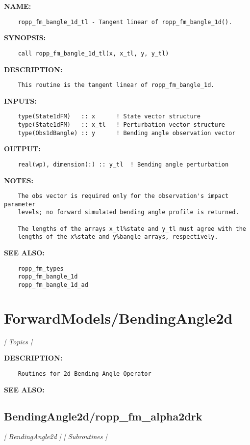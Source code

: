 \label{ch:robo6}
\label{ch:BendingAngle_ropp_fm_bangle_1d_tl}
\textbf{NAME:}\hspace{0.08in}\begin{Verbatim}
    ropp_fm_bangle_1d_tl - Tangent linear of ropp_fm_bangle_1d().
\end{Verbatim}
\textbf{SYNOPSIS:}\hspace{0.08in}\begin{Verbatim}
    call ropp_fm_bangle_1d_tl(x, x_tl, y, y_tl)
\end{Verbatim}
\textbf{DESCRIPTION:}\hspace{0.08in}\begin{Verbatim}
    This routine is the tangent linear of ropp_fm_bangle_1d.
\end{Verbatim}
\textbf{INPUTS:}\hspace{0.08in}\begin{Verbatim}
    type(State1dFM)   :: x      ! State vector structure
    type(State1dFM)   :: x_tl   ! Perturbation vector structure
    type(Obs1dBangle) :: y      ! Bending angle observation vector
\end{Verbatim}
\textbf{OUTPUT:}\hspace{0.08in}\begin{Verbatim}
    real(wp), dimension(:) :: y_tl  ! Bending angle perturbation
\end{Verbatim}
\textbf{NOTES:}\hspace{0.08in}\begin{Verbatim}
    The obs vector is required only for the observation's impact parameter
    levels; no forward simulated bending angle profile is returned.

    The lengths of the arrays x_tl%state and y_tl must agree with the 
    lengths of the x%state and y%bangle arrays, respectively.
\end{Verbatim}
\textbf{SEE ALSO:}\hspace{0.08in}\begin{Verbatim}
    ropp_fm_types
    ropp_fm_bangle_1d
    ropp_fm_bangle_1d_ad
\end{Verbatim}
\section{ForwardModels/BendingAngle2d}
\textsl{[ Topics ]}

\label{ch:robo42}
\label{ch:ForwardModels_BendingAngle2d}
\textbf{DESCRIPTION:}\hspace{0.08in}\begin{Verbatim}
    Routines for 2d Bending Angle Operator
\end{Verbatim}
\textbf{SEE ALSO:}\hspace{0.08in}\subsection{BendingAngle2d/ropp\_fm\_alpha2drk}
\textsl{[ BendingAngle2d ]}
\textsl{[ Subroutines ]}

